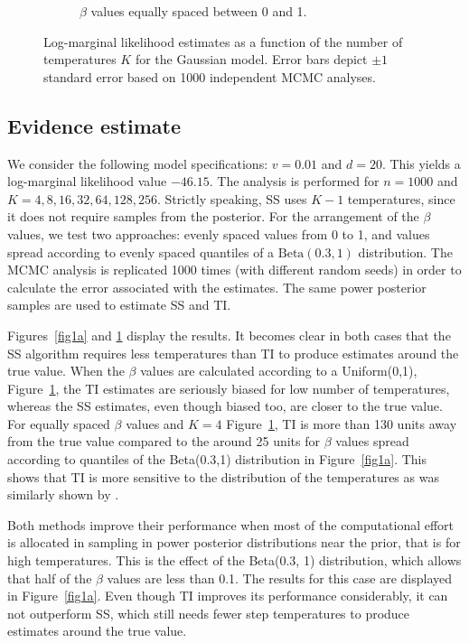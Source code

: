 \documentclass[aps,reprint,amsmath,amssymb,showpacs,showkeys]{revtex4-1}%
\newcommand{\cb}{ \color{blue}}
\begin{document}
\begin{figure}[]
\begin{subfigure}{0.50\textwidth}
		\caption{$\beta$ values equally spaced between 0 and 1.} %
		\label{fig1b}
	\end{subfigure}	
	\caption{Log-marginal likelihood estimates as a function of the number of temperatures $K$ for the Gaussian model.  Error bars depict $\pm1$ standard error based on 1000 independent MCMC analyses.}		
	\label{fig1}
\end{figure}

\subsection{Evidence estimate}

We consider the following model specifications: $v = 0.01$ and $d = 20$.  This yields a log-marginal likelihood value $-46.15$.  The analysis is performed for $n = 1000$ and $K = 4, 8, 16, 32, 64, 128, 256$.  Strictly speaking, SS uses $K-1$ temperatures, since it does not require samples from the posterior.  For the arrangement of the $\beta$ values, we test two approaches: evenly spaced values from 0 to 1, and values spread according to evenly spaced quantiles of a $\text{Beta}(0.3, 1)$ distribution.  The MCMC analysis is replicated 1000 times (with different random seeds) in order to calculate the error associated with the estimates.  The same power posterior samples are used to estimate SS and TI. %

Figures~\ref{fig1a} and \ref{fig1b} display the results. It becomes clear in both cases that the SS algorithm requires less temperatures than TI to produce estimates around the true value.  When the $\beta$ values are calculated according to a Uniform(0,1), Figure~\ref{fig1b}, the TI estimates are seriously biased for low number of temperatures, whereas the SS estimates, even though biased too,  are closer to the true value.  For equally spaced $\beta$ values and $K=4$ Figure~\ref{fig1b}, TI is more than 130 units away from the true value compared to the around 25 units for $\beta$ values spread according to quantiles of the Beta(0.3,1) distribution  in Figure~\ref{fig1a}.  This shows that TI is more sensitive to the distribution of the temperatures as was similarly shown by \cite{Xie:Lewis:Fan:Kuo:Chen:2011}.

Both methods improve their performance when most of the computational effort is allocated in sampling in power posterior distributions near the prior, that is for high temperatures.  This is the effect of the Beta(0.3, 1) distribution, which allows that half of the $\beta$ values are less than 0.1.  The results for this case are displayed in Figure~\ref{fig1a}.  Even though TI improves its performance considerably, it can not outperform SS, which still needs fewer step temperatures to produce estimates around the true value. 
\end{document}
